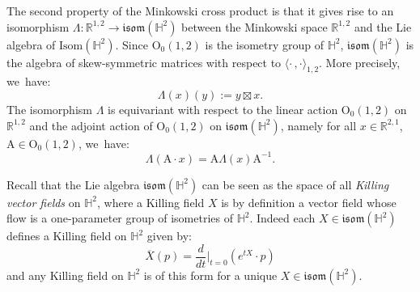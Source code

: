 \documentclass[11pt]{article}
\theoremstyle{plain}
\theoremstyle{definition}
\newcommand{\minko}{\mathbb{R}^{1,2}}
\newcommand{\inner}[1] {\langle #1 \rangle}
\begin{document}
The second property of the Minkowski cross product is that it gives rise to an isomorphism $\Lambda: \mathbb{R}^{1,2}\to \mathfrak{isom}(\mathbb{H}^2)$ between the Minkowski space $\minko$ and the Lie algebra of $\mathrm{Isom}(\mathbb{H}^2)$. Since $\mathrm{O}_0(1,2)$ is the isometry group of $\mathbb{H}^2$, $\mathfrak{isom}(\mathbb{H}^2)$ is the algebra of skew-symmetric matrices with respect to $\inner{\cdot\,,\cdot}_{1,2}$. More precisely, we~have:\vspace*{-3pt}
\begin{equation}\label{lievskilling}
\Lambda(x)(y):=y\boxtimes x.
\end{equation}
The isomorphism $\Lambda$ is equivariant with respect to the linear action $\mathrm{O}_0(1,2)$ on $\minko$ and the adjoint action of $\mathrm{O}_0(1,2)$ on $\mathfrak{isom}(\mathbb{H}^2)$, namely for all $x\in \mathbb{R}^{2,1}$, $\mathrm{A}\in\mathrm{O}_0(1,2)$, we~have:\vspace*{-3pt}
\begin{equation}\label{adequivariance}
\Lambda(\mathrm{A}\cdot x)=\mathrm{A}\Lambda(x)\mathrm{A}^{-1}.
\end{equation}

Recall that the Lie algebra $\mathfrak{isom}(\mathbb{H}^2)$ can be seen as the space of all \emph{Killing vector fields} on $\mathbb{H}^2$, where a Killing field $X$ is by definition a vector field whose flow is a one-parameter group of isometries of $\mathbb{H}^2$. Indeed each $X\in \mathfrak{isom}(\mathbb{H}^2)$ defines a Killing field on $\mathbb{H}^2$ given by:
\[
\overline{X}(p)=\frac{d}{dt}\Big\lvert_{t=0} (e^{tX}\cdot p)
\]
and any Killing field on $\mathbb{H}^2$ is of this form for a unique $X \in \mathfrak{isom}(\mathbb{H}^2)$.
\end{document}
